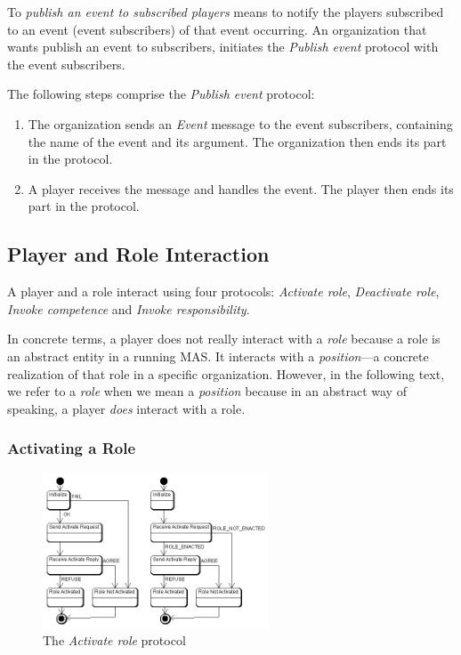 To \textit{publish an event to subscribed players} means to notify the players subscribed to an event (event subscribers) of that event occurring.
An organization that wants publish an event to subscribers, initiates the \textit{Publish event} protocol with the event subscribers.

The following steps comprise the \textit{Publish event} protocol:
\begin{enumerate}
	\item The organization sends an \textit{Event} message to the event subscribers, containing the name of the event and its argument.
	The organization then ends its part in the protocol.
	\item A player receives the message and handles the event.
	The player then ends its part in the protocol.
\end{enumerate}

\subsection{Player and Role Interaction}

A player and a role interact using four protocols: \textit{Activate role}, \textit{Deactivate role}, \textit{Invoke competence} and \textit{Invoke responsibility}.

In concrete terms, a player does not really interact with a \textit{role} because a role is an abstract entity in a running MAS.
It interacts with a \textit{position}---a concrete realization of that role in a specific organization.
However, in the following text, we refer to a \textit{role} when we mean a \textit{position} because in an abstract way of speaking, a player \textit{does} interact with a role.

\subsubsection{Activating a Role}
\label{section:activating-a-role}

\begin{figure}[ht]
	\centering
	\includegraphics[width=0.6\textwidth]{images/thespian/activate-role-protocol}
	\caption{The \textit{Activate role} protocol}
	\label{figure:thespian-activate-role-protocol}
\end{figure}

